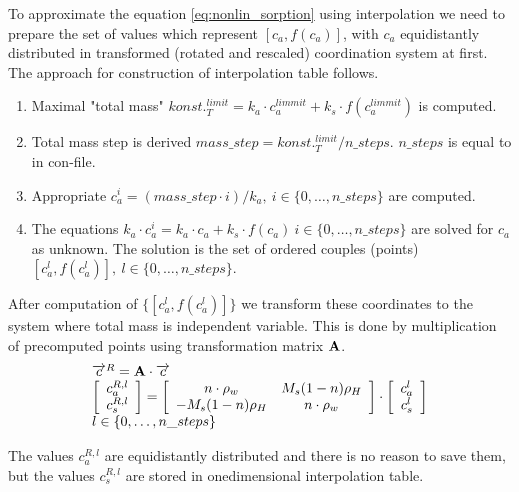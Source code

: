 To approximate the equation \ref{eq:nonlin_sorption} using interpolation we need to prepare the set of values which represent $[c_a, f(c_a)]$, with $c_a$ equidistantly distributed in transformed (rotated and rescaled) coordination system at first. The approach for construction of interpolation table follows.
\begin{enumerate}
 \item Maximal "total mass" $konst._T^{limit} = k_a\cdot c_a^{limmit} + k_s\cdot f(c_a^{limmit})$ is computed.
 \item Total mass step is derived $mass\_step = konst._T^{limit}/n\_steps$. $n\_steps$ is equal to  in con-file.
 \item Appropriate $c_a^i = (mass\_step\cdot i)/k_a,~i\in \{0,\ldots, n\_steps\}$ are computed. 
 \item The equations $k_a\cdot c_a^i = k_a\cdot c_a + k_s\cdot f(c_a)~i\in \{0,\ldots, n\_steps\}$ are solved for $c_a$ as unknown. The solution is the set of ordered couples (points) $[c_a^l,f(c_a^l)],~l\in\{0,\ldots,n\_steps\}$.
\end{enumerate}
After computation of $\{[c_a^l,f(c_a^l)]\}$ we transform these coordinates to the system where total mass is independent variable. This is done by multiplication of precomputed points using transformation matrix ${\bf A}$.
\begin{equation}
 \begin{array}{l}
  \overrightarrow{c}^R = {\bf A}\cdot\overrightarrow{c}\\
  \left[\begin{array}{c} c_a^{R,l}\\ c_s^{R,l} \end{array}\right] = 
  \left[\begin{array}{cc}
    n\cdot \rho_w & M_s(1 - n)\rho_H\\
    -M_s(1 - n)\rho_H & n\cdot \rho_w
  \end{array}\right]\cdot
  \left[\begin{array}{c} c_a^l\\ c_s^l \end{array}\right]\\
  l\in\{0,\ldots,n\_steps\}
 \end{array}
 \label{eq:transf_mat}
\end{equation}

The values $c_a^{R,l}$ are equidistantly distributed and there is no reason to save them, but the values $c_s^{R,l}$ are stored in onedimensional interpolation table.

